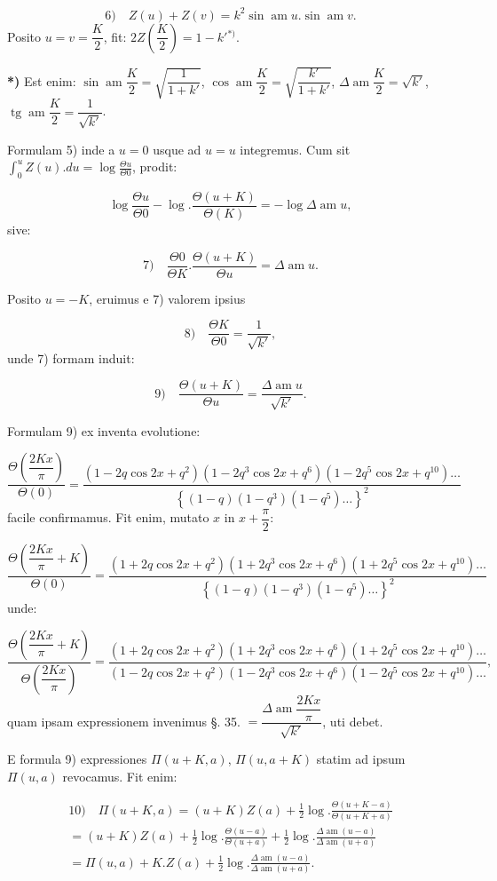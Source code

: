 \documentclass{article}
\begin{document}
\[
\text{6)}\quad Z(u)+Z(v)=k^{2}\sin\operatorname{am}u.\sin\operatorname{am}v.
\]
Posito $u=v=\dfrac{K}{2}$, fit: $2Z\left(\dfrac{K}{2}\right)=1-k'{}^{*)}$.

\textbf{*)} Est enim: $\sin\operatorname{am}\dfrac{K}{2}=\sqrt{\dfrac{1}{1+k'}}$, $\cos\operatorname{am}\dfrac{K}{2}=\sqrt{\dfrac{k'}{1+k'}}$, $\Delta\operatorname{am}\dfrac{K}{2}=\sqrt{k'}$, $\operatorname{tg}\operatorname{am}\dfrac{K}{2}=\dfrac{1}{\sqrt{k'}}$.

Formulam 5) inde a $u=0$ usque ad $u=u$ integremus. Cum sit $\displaystyle\int_{0}^{u}Z(u).du=\log\frac{\Theta u}{\Theta0}$, prodit:

\[
\log\frac{\Theta u}{\Theta0}-\log.\frac{\Theta(u+K)}{\Theta(K)}=-\log\Delta\operatorname{am}u,
\]
sive:

\[
\text{7)}\quad \frac{\Theta0}{\Theta K}.\frac{\Theta(u+K)}{\Theta u}=\Delta\operatorname{am}u.
\]

Posito $u=-K$, eruimus e 7) valorem ipsius

\[
\text{8)}\quad \frac{\Theta K}{\Theta0}=\frac{1}{\sqrt{k'}},
\]
unde 7) formam induit:

\[
\text{9)}\quad \frac{\Theta(u+K)}{\Theta u}=\frac{\Delta\operatorname{am}u}{\sqrt{k'}}.
\]

Formulam 9) ex inventa evolutione:

\[
\frac{\Theta\left(\dfrac{2Kx}{\pi}\right)}{\Theta(0)}=\frac{(1-2q\cos2x+q^{2})(1-2q^{3}\cos2x+q^{6})(1-2q^{5}\cos2x+q^{10})\ldots}{\left\{(1-q)(1-q^{3})(1-q^{5})\ldots\right\}^{2}}
\]
facile confirmamus. Fit enim, mutato $x$ in $x+\dfrac{\pi}{2}$:

\[
\frac{\Theta\left(\dfrac{2Kx}{\pi}+K\right)}{\Theta(0)}=\frac{(1+2q\cos2x+q^{2})(1+2q^{3}\cos2x+q^{6})(1+2q^{5}\cos2x+q^{10})\ldots}{\left\{(1-q)(1-q^{3})(1-q^{5})\ldots\right\}^{2}}
\]
unde:

\[
\frac{\Theta\left(\dfrac{2Kx}{\pi}+K\right)}{\Theta\left(\dfrac{2Kx}{\pi}\right)}=\frac{(1+2q\cos2x+q^{2})(1+2q^{3}\cos2x+q^{6})(1+2q^{5}\cos2x+q^{10})\ldots}{(1-2q\cos2x+q^{2})(1-2q^{3}\cos2x+q^{6})(1-2q^{5}\cos2x+q^{10})\ldots},
\]
quam ipsam expressionem invenimus §. 35. $=\dfrac{\Delta\operatorname{am}\dfrac{2Kx}{\pi}}{\sqrt{k'}}$, uti debet.

E formula 9) expressiones $\Pi(u+K,a)$, $\Pi(u,a+K)$ statim ad ipsum $\Pi(u,a)$ revocamus. Fit enim:

\[
\begin{gathered}
\text{10)}\quad \Pi(u+K,a)=(u+K)Z(a)+\frac{1}{2}\log.\frac{\Theta(u+K-a)}{\Theta(u+K+a)}\\[1.5ex]
=(u+K)Z(a)+\frac{1}{2}\log.\frac{\Theta(u-a)}{\Theta(u+a)}+\frac{1}{2}\log.\frac{\Delta\operatorname{am}(u-a)}{\Delta\operatorname{am}(u+a)}\\[1.5ex]
=\Pi(u,a)+K.Z(a)+\frac{1}{2}\log.\frac{\Delta\operatorname{am}(u-a)}{\Delta\operatorname{am}(u+a)}.
\end{gathered}
\]
\end{document}
